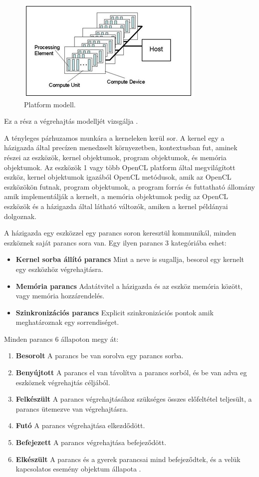 \begin{figure}[h]
\centering
\includegraphics[scale=1.0]{images/platform_modell.jpg}
\caption{Platform modell. \cite{spec_platform}}
\label{fig:platform_modell}
\end{figure}

Ez a rész a végrehajtás modelljét vizsgálja \cite{spec_exec}.

A tényleges párhuzamos munkára a kerneleken kerül sor. A kernel egy a házigazda által precízen menedzselt környezetben, kontextusban fut, aminek részei az eszközök, kernel objektumok, program objektumok, és memória objektumok. Az eszközök 1 vagy több OpenCL platform által megvilágított eszköz, kernel objektumok igazából OpenCL metódusok, amik az OpenCL eszközökön futnak, program objektumok, a program forrás és futtatható állomány amik implementálják a kernelt, a memória objektumok pedig az OpenCL eszközök és a házigazda által látható változók, amiken a kernel példányai dolgoznak.

A házigazda egy eszközzel egy parancs soron keresztül kommunikál, minden eszköznek saját parancs sora van. Egy ilyen parancs 3 kategóriába eshet:
\begin{itemize}
\item\textbf{Kernel sorba állító parancs} Mint a neve is sugallja, besorol egy kernelt egy eszközhöz végrehajtásra.
\item\textbf{Memória parancs} Adatátvitel a házigazda és az eszköz memória között, vagy memória hozzárendelés.
\item\textbf{Szinkronizációs parancs} Explicit szinkronizációs pontok amik meghatároznak egy sorrendiséget.
\end{itemize}
Minden parancs 6 állapoton megy át:
\begin{enumerate}
\item\textbf{Besorolt} A parancs be van sorolva egy parancs sorba.
\item\textbf{Benyújtott} A parancs el van távolítva a parancs sorból, és be van adva eg eszköznek végrehajtás céljából.
\item\textbf{Felkészült} A parancs végrehajtásához szükséges összes előfeltétel teljesült, a parancs ütemezve van végrehajtásra.
\item\textbf{Futó} A parancs végrehajtása elkezdődött.
\item\textbf{Befejezett} A parancs végrehajtása befejeződött.
\item\textbf{Elkészült} A parancs és a gyerek parancsai mind befejeződtek, és a velük kapcsolatos esemény objektum állapota .
\end{enumerate}

